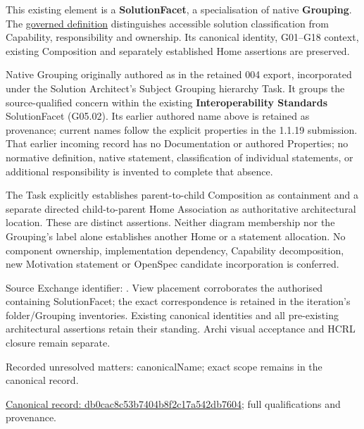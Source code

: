 This existing element is a \textbf{SolutionFacet}, a specialisation of native
\textbf{Grouping}. The \href{\detokenize{../../../../../../../governance/continuum-representation.md#solutionfacet-classification--1119-candidate}}{governed definition}
distinguishes accessible solution classification from Capability, responsibility
and ownership. Its canonical identity, G01–G18 context, existing Composition
and separately established Home assertions are preserved.



Native Grouping originally authored as \texttt{} in the retained 004 export,
incorporated under the Solution Architect's Subject Grouping hierarchy Task.
It groups the source-qualified \texttt{} concern within
the existing \textbf{Interoperability Standards} SolutionFacet (G05.02). Its earlier authored name above is retained as provenance; current names
follow the explicit properties in the 1.1.19 submission.
That earlier incoming record has no Documentation or authored Properties; no normative
definition, native statement, classification of individual statements, or
additional responsibility is invented to complete that absence.



The Task explicitly establishes parent-to-child Composition as containment and
a separate directed child-to-parent Home Association as authoritative architectural
location. These are distinct assertions. Neither diagram membership nor the
Grouping's label alone establishes another Home or a statement allocation.
No component ownership, implementation dependency, Capability decomposition,
new Motivation statement or OpenSpec candidate incorporation is conferred.



Source Exchange identifier: \texttt{}. View placement corroborates
the authorised containing SolutionFacet; the exact correspondence is retained in the
iteration's folder/Grouping inventories. Existing canonical identities and all
pre-existing architectural assertions retain their standing. Archi visual
acceptance and HCRL closure remain separate.


{\small Recorded unresolved matters: canonicalName; exact scope remains in the canonical record.}\par
{\footnotesize \href{../../../../../../../continuum/grouping/db0cac8c53b7404b8f2c17a542db7604.md}{Canonical record: db0cac8c53b7404b8f2c17a542db7604}; full qualifications and provenance.}\par
